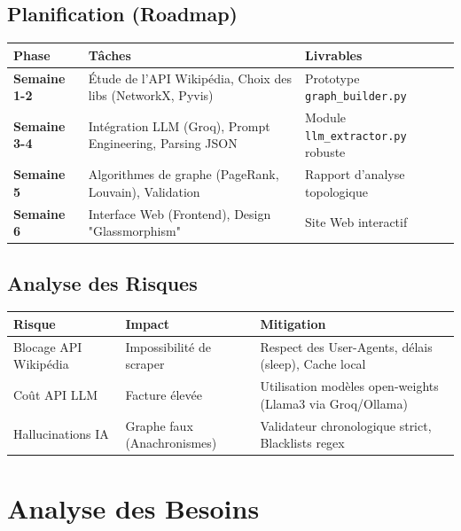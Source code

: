 \documentclass[12pt,a4paper]{report}
\begin{document}
\section{Planification (Roadmap)}
\begin{longtable}{|p{3cm}|p{6cm}|p{5cm}|}
\hline
\rowcolor{ice500!20}
\textbf{Phase} & \textbf{Tâches} & \textbf{Livrables} \\
\hline
\textbf{Semaine 1-2} & Étude de l'API Wikipédia, Choix des libs (NetworkX, Pyvis) & Prototype \texttt{graph\_builder.py} \\
\hline
\textbf{Semaine 3-4} & Intégration LLM (Groq), Prompt Engineering, Parsing JSON & Module \texttt{llm\_extractor.py} robuste \\
\hline
\textbf{Semaine 5} & Algorithmes de graphe (PageRank, Louvain), Validation & Rapport d'analyse topologique \\
\hline
\textbf{Semaine 6} & Interface Web (Frontend), Design "Glassmorphism" & Site Web interactif \\
\hline
\end{longtable}

\section{Analyse des Risques}
\begin{table}[H]
\centering
\begin{tabular}{|p{4cm}|p{6cm}|p{5cm}|}
\hline
\rowcolor{purple!20}
\textbf{Risque} & \textbf{Impact} & \textbf{Mitigation} \\
\hline
Blocage API Wikipédia & Impossibilité de scraper & Respect des User-Agents, délais (sleep), Cache local \\
\hline
Coût API LLM & Facture élevée & Utilisation modèles open-weights (Llama3 via Groq/Ollama) \\
\hline
Hallucinations IA & Graphe faux (Anachronismes) & Validateur chronologique strict, Blacklists regex \\
\hline
\end{tabular}
\end{table}

\chapter{Analyse des Besoins}
\end{document}
